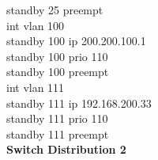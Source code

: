 \documentclass[a4paper, 12pt]{article}
\begin{document}
{\hspace*{2cm}standby 25 preempt\\
\hspace*{2cm}int vlan 100\\
\hspace*{2cm}standby 100 ip 200.200.100.1\\
\hspace*{2cm}standby 100 prio 110\\
\hspace*{2cm}standby 100 preempt\\
\hspace*{2cm}int vlan 111\\
\hspace*{2cm}standby 111 ip 192.168.200.33\\
\hspace*{2cm}standby 111 prio 110\\
\hspace*{2cm}standby 111 preempt\\}
\hspace*{2cm}\textbf{Switch Distribution 2}\\
\end{document}
